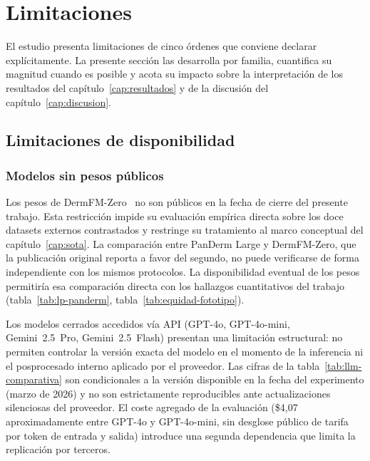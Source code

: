 
\chapter{Limitaciones}
\label{cap:limitaciones}

El estudio presenta limitaciones de cinco órdenes que conviene
declarar explícitamente. La presente sección las desarrolla por
familia, cuantifica su magnitud cuando es posible y acota su
impacto sobre la interpretación de los resultados del
capítulo~\ref{cap:resultados} y de la discusión del
capítulo~\ref{cap:discusion}.

\section{Limitaciones de disponibilidad}
\label{sec:lim-disponibilidad}

\subsection{Modelos sin pesos públicos}
\label{sec:lim-pesos}

Los pesos de DermFM-Zero~\cite{dermfmzero2026} no son públicos en
la fecha de cierre del presente trabajo. Esta restricción impide
su evaluación empírica directa sobre los doce datasets externos
contrastados y restringe su tratamiento al marco conceptual del
capítulo~\ref{cap:sota}. La comparación entre PanDerm Large y
DermFM-Zero, que la publicación original reporta a favor del
segundo, no puede verificarse de forma independiente con los mismos
protocolos. La disponibilidad eventual de los pesos permitiría esa
comparación directa con los hallazgos cuantitativos del trabajo
(tabla~\ref{tab:lp-panderm}, tabla~\ref{tab:equidad-fototipo}).

Los modelos cerrados accedidos vía API (GPT-4o, GPT-4o-mini,
Gemini~2.5~Pro, Gemini~2.5~Flash) presentan una limitación
estructural: no permiten controlar la versión exacta del modelo en
el momento de la inferencia ni el posprocesado interno aplicado
por el proveedor. Las cifras de la tabla~\ref{tab:llm-comparativa}
son condicionales a la versión disponible en la fecha del
experimento (marzo de 2026) y no son estrictamente reproducibles
ante actualizaciones silenciosas del proveedor. El coste agregado
de la evaluación (\$4{,}07 aproximadamente entre GPT-4o y
GPT-4o-mini, sin desglose público de tarifa por token de entrada y
salida) introduce una segunda dependencia que limita la
replicación por terceros.

